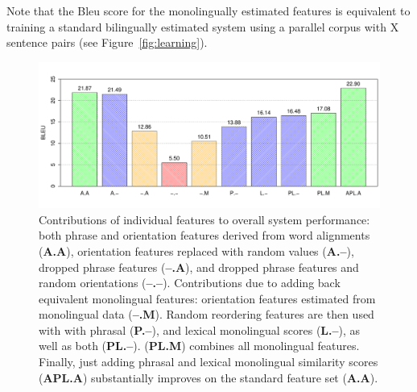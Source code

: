 \documentclass[11pt]{article}
\newcommand{\mnote}[1]{\marginpar{%
  \vskip-\baselineskip
  \raggedright\footnotesize
  \itshape\hrule\smallskip\tiny{#1}\par\smallskip\hrule}}
\newcommand{\mtodo}[1]{\mnote{\textcolor{red}{#1}}}
\newcommand{\figref}[1]{Figure~\ref{#1}}
\begin{document}
\mtodo{Fix here and in legend when new results are in.}  Note that the Bleu  score for the monolingually estimated features is equivalent to training a standard bilingually estimated system using a parallel corpus with X sentence pairs (see \figref{fig:learning}).  \mtodo{Fill in from learning curve.}

\begin{figure}[t]
\begin{center}
\includegraphics[width=\linewidth]{../figures/lesionreplacement/lesionreplacement.pdf}
\caption{Contributions of individual features to overall system performance: both phrase and orientation features derived from word alignments ({\bf A.A}), orientation features replaced with random values ({\bf A.--}), dropped phrase features ({\bf --.A}), and dropped phrase features and random orientations ({\bf --.--}).  Contributions due to adding back equivalent monolingual features: orientation features estimated from monolingual data ({\bf --.M}).  Random reordering features are then used with with phrasal ({\bf P.--}), and lexical monolingual scores ({\bf L.--}), as well as both ({\bf PL.--}).  ({\bf PL.M}) combines all monolingual features.  Finally, just adding phrasal and lexical monolingual similarity scores ({\bf APL.A}) substantially improves on the standard feature set ({\bf A.A}).}
\label{fig:lesionreplacement}
\end{center}
\vskip -0.2in
\end{figure}
\end{document}
